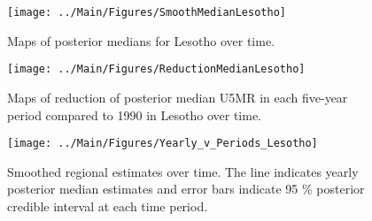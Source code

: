 \documentclass[12pt]{article}\usepackage[]{graphicx}\usepackage[]{color}
\newenvironment{knitrout}{}{} %
\begin{document}
\begin{knitrout}
\color{fgcolor}\begin{figure}[bht]

{\centering \texttt{[image: ../Main/Figures/SmoothMedianLesotho]} 

}

\caption[Maps of posterior medians for Lesotho  over time]{Maps of posterior medians for Lesotho  over time.}\label{fig:unnamed-chunk-174}
\end{figure}


\end{knitrout}
\begin{knitrout}
\color{fgcolor}\begin{figure}[bht]

{\centering \texttt{[image: ../Main/Figures/ReductionMedianLesotho]} 

}

\caption[Maps of reduction of posterior median U5MR in each five-year period compared to 1990 in Lesotho over time]{Maps of reduction of posterior median U5MR in each five-year period compared to 1990 in Lesotho over time.}\label{fig:unnamed-chunk-175}
\end{figure}


\end{knitrout}
\begin{knitrout}
\color{fgcolor}\begin{figure}[bht]

{\centering \texttt{[image: ../Main/Figures/Yearly\_v\_Periods\_Lesotho]} 

}

\caption[Smoothed regional estimates over time]{Smoothed regional estimates over time. The line indicates yearly posterior median estimates and error bars indicate 95 \% posterior credible interval at each time period.}\label{fig:unnamed-chunk-176}
\end{figure}


\end{knitrout}
\end{document}
